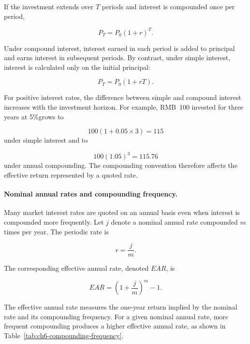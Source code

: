 If the investment extends over $T$ periods and interest is compounded once per period,

\begin{equation}
P_T=P_0(1+r)^T.
\label{eq:ch6-compound-growth}
\end{equation}

Under compound interest, interest earned in each period is added to principal and earns interest in subsequent periods. By contrast, under simple interest, interest is calculated only on the initial principal:

\begin{equation}
P_T=P_0(1+rT).
\label{eq:ch6-simple-interest}
\end{equation}

For positive interest rates, the difference between simple and compound interest increases with the investment horizon. For example, RMB~100 invested for three years at 5\%grows to

$$
100(1+0.05\times 3)=115
$$
under simple interest and to

$$
100(1.05)^3=115.76
$$
under annual compounding. The compounding convention therefore affects the effective return represented by a quoted rate.

\paragraph{Nominal annual rates and compounding frequency.}

Many market interest rates are quoted on an annual basis even when interest is compounded more frequently. Let $j$ denote a nominal annual rate compounded $m$ times per year. The periodic rate is

\begin{equation}
r=\frac{j}{m}.
\end{equation}

The corresponding effective annual rate, denoted $EAR$, is

\begin{equation}
EAR=
\left(1+\frac{j}{m}\right)^m-1.
\label{eq:ch6-ear}
\end{equation}

The effective annual rate measures the one-year return implied by the nominal rate and its compounding frequency. For a given nominal annual rate, more frequent compounding produces a higher effective annual rate, as shown in Table~\ref{tab:ch6-compounding-frequency}.


